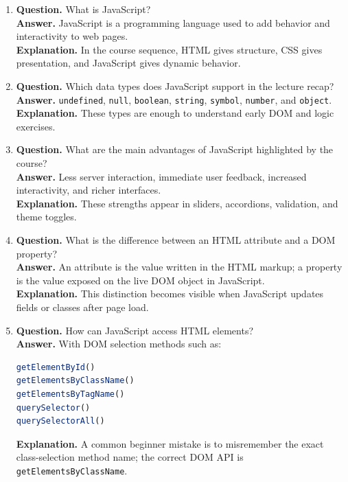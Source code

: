 \documentclass[11pt,a4paper]{article}
\begin{document}
\begin{enumerate}
  \item \textbf{Question.} What is JavaScript?\\
  \textbf{Answer.} JavaScript is a programming language used to add behavior and interactivity to web pages.\\
  \textbf{Explanation.} In the course sequence, HTML gives structure, CSS gives presentation, and JavaScript gives dynamic behavior.

  \item \textbf{Question.} Which data types does JavaScript support in the lecture recap?\\
  \textbf{Answer.} \texttt{undefined}, \texttt{null}, \texttt{boolean}, \texttt{string}, \texttt{symbol}, \texttt{number}, and \texttt{object}.\\
  \textbf{Explanation.} These types are enough to understand early DOM and logic exercises.

  \item \textbf{Question.} What are the main advantages of JavaScript highlighted by the course?\\
  \textbf{Answer.} Less server interaction, immediate user feedback, increased interactivity, and richer interfaces.\\
  \textbf{Explanation.} These strengths appear in sliders, accordions, validation, and theme toggles.

  \item \textbf{Question.} What is the difference between an HTML attribute and a DOM property?\\
  \textbf{Answer.} An attribute is the value written in the HTML markup; a property is the value exposed on the live DOM object in JavaScript.\\
  \textbf{Explanation.} This distinction becomes visible when JavaScript updates fields or classes after page load.

  \item \textbf{Question.} How can JavaScript access HTML elements?\\
  \textbf{Answer.} With DOM selection methods such as:
\begin{lstlisting}[style=code, language=JavaScript]
getElementById()
getElementsByClassName()
getElementsByTagName()
querySelector()
querySelectorAll()
\end{lstlisting}
  \textbf{Explanation.} A common beginner mistake is to misremember the exact class-selection method name; the correct DOM API is \texttt{getElementsByClassName}.


\end{enumerate}
\end{document}
